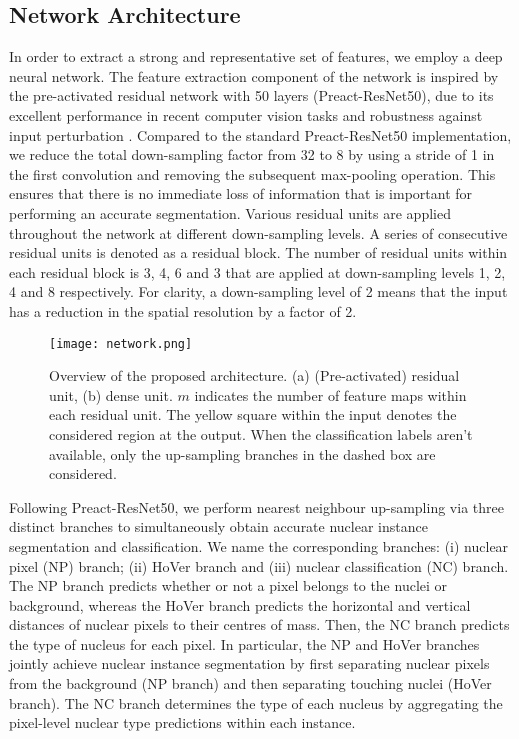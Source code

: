 \documentclass[journal]{IEEEtran}
\begin{document}
	\subsection{Network Architecture} \label{section:networkarchitecture}
    In order to extract a strong and representative set of features, we employ a deep neural network. The feature extraction component of the network is inspired by the pre-activated residual network with 50 layers \cite{preact_resnet} (Preact-ResNet50), due to its excellent performance in recent computer vision tasks \cite{imagenet_cvpr09} and robustness against input perturbation \cite{anurag2018resnet_robustness}. Compared to the standard Preact-ResNet50 implementation, we reduce the total down-sampling factor from 32 to 8 by using a stride of 1 in the first convolution and removing the subsequent max-pooling operation. This ensures that there is no immediate loss of information that is important for performing an accurate segmentation. Various residual units are applied throughout the network at different down-sampling levels. A series of consecutive residual units is denoted as a residual block. The number of residual units within each residual block is 3, 4, 6 and 3 that are applied at down-sampling levels 1, 2, 4 and 8 respectively. For clarity, a down-sampling level of 2 means that the input has a reduction in the spatial resolution by a factor of 2.

	\begin{figure*}[t!]
		\centering
		\texttt{[image: network.png]}
		\caption{Overview of the proposed architecture. (a) (Pre-activated) residual unit, (b) dense unit. $m$ indicates the number of feature maps within each residual unit. The yellow square within the input denotes the considered region at the output. When the classification labels aren't available, only the up-sampling branches in the dashed box are considered.}
		\label{fig:xy_network}
	\end{figure*}
	

    Following Preact-ResNet50, we perform nearest neighbour up-sampling via three distinct branches to simultaneously obtain accurate nuclear instance segmentation and classification. We name the corresponding branches: (i) nuclear pixel (NP) branch; (ii) HoVer branch and (iii) nuclear classification (NC) branch. The NP branch predicts whether or not a pixel belongs to the nuclei or background, whereas the HoVer branch predicts the horizontal and vertical distances of nuclear pixels to their centres of mass. Then, the NC branch predicts the type of nucleus for each pixel. In particular, the NP and HoVer branches jointly achieve nuclear instance segmentation by first separating nuclear pixels from the background (NP branch) and then separating touching nuclei (HoVer branch). The NC branch determines the type of each nucleus by aggregating the pixel-level nuclear type predictions within each instance.
    
\end{document}
